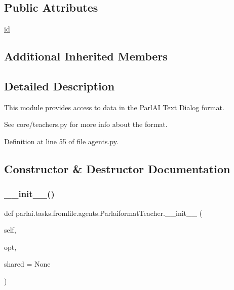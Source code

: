 \subsection*{Public Attributes}
\begin{DoxyCompactItemize}
\item 
\hyperlink{classparlai_1_1tasks_1_1fromfile_1_1agents_1_1ParlaiformatTeacher_af21d1457ab02cd0d2d0583d1c543004f}{id}
\end{DoxyCompactItemize}
\subsection*{Additional Inherited Members}


\subsection{Detailed Description}
\begin{DoxyVerb}This module provides access to data in the ParlAI Text Dialog format.

See core/teachers.py for more info about the format.
\end{DoxyVerb}
 

Definition at line 55 of file agents.\+py.



\subsection{Constructor \& Destructor Documentation}
\mbox{\label{classparlai_1_1tasks_1_1fromfile_1_1agents_1_1ParlaiformatTeacher_a8d12f43b6359996764d176ba9a21189c}} 
\subsubsection{\texorpdfstring{\+\_\+\+\_\+init\+\_\+\+\_\+()}{\_\_init\_\_()}}
{\footnotesize\ttfamily def parlai.\+tasks.\+fromfile.\+agents.\+Parlaiformat\+Teacher.\+\_\+\+\_\+init\+\_\+\+\_\+ (\begin{DoxyParamCaption}\item[{}]{self,  }\item[{}]{opt,  }\item[{}]{shared = {\ttfamily None} }\end{DoxyParamCaption})}



